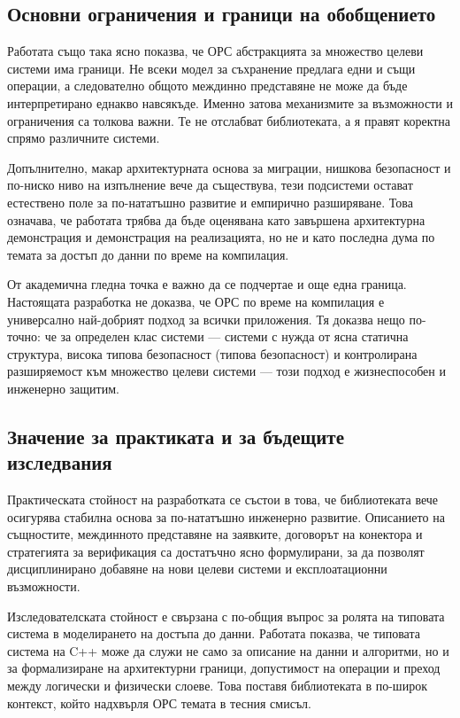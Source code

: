 \subsection{Основни ограничения и граници на обобщението}

Работата също така ясно показва, че ОРС абстракцията за множество целеви системи има граници. Не всеки модел за съхранение предлага едни и същи операции, а следователно общото междинно представяне не може да бъде интерпретирано еднакво навсякъде. Именно затова механизмите за възможности и ограничения са толкова важни. Те не отслабват библиотеката, а я правят коректна спрямо различните системи.

Допълнително, макар архитектурната основа за миграции, нишкова безопасност и по-ниско ниво на изпълнение вече да съществува, тези подсистеми остават естествено поле за по-нататъшно развитие и емпирично разширяване. Това означава, че работата трябва да бъде оценявана като завършена архитектурна демонстрация и демонстрация на реализацията, но не и като последна дума по темата за достъп до данни по време на компилация.

От академична гледна точка е важно да се подчертае и още една граница. Настоящата разработка не доказва, че ОРС по време на компилация е универсално най-добрият подход за всички приложения. Тя доказва нещо по-точно: че за определен клас системи --- системи с нужда от ясна статична структура, висока типова безопасност (типова безопасност) и контролирана разширяемост към множество целеви системи --- този подход е жизнеспособен и инженерно защитим.

\subsection{Значение за практиката и за бъдещите изследвания}

Практическата стойност на разработката се състои в това, че библиотеката вече осигурява стабилна основа за по-нататъшно инженерно развитие. Описанието на същностите, междинното представяне на заявките, договорът на конектора и стратегията за верификация са достатъчно ясно формулирани, за да позволят дисциплинирано добавяне на нови целеви системи и експлоатационни възможности.

Изследователската стойност е свързана с по-общия въпрос за ролята на типовата система в моделирането на достъпа до данни. Работата показва, че типовата система на C++ може да служи не само за описание на данни и алгоритми, но и за формализиране на архитектурни граници, допустимост на операции и преход между логически и физически слоеве. Това поставя библиотеката в по-широк контекст, който надхвърля ОРС темата в тесния смисъл.


